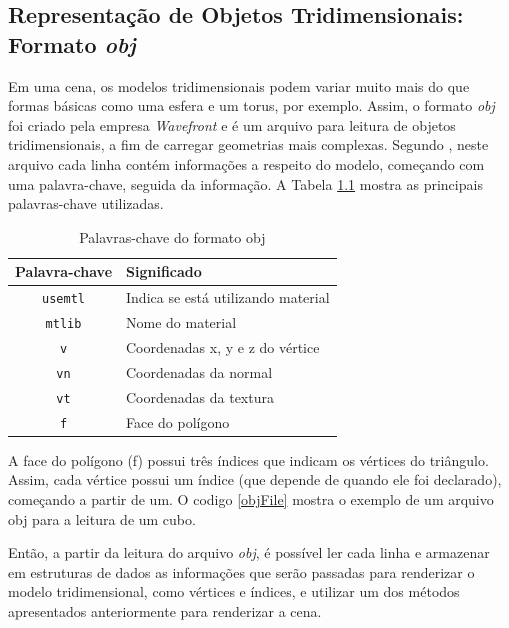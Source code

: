 \begin{anexosenv}
\chapter{Representação de Objetos Tridimensionais: Formato \textit{obj}}
\label{formatobj}

	Em uma cena, os modelos tridimensionais podem variar muito mais do que formas básicas como uma esfera e um torus, por exemplo. Assim, o formato \textit{obj} foi criado pela empresa  \textit{Wavefront} e é um arquivo para leitura de objetos tridimensionais, a fim de carregar geometrias mais complexas. Segundo \cite{graphicsprog}, neste arquivo cada linha contém informações a respeito do modelo, começando com uma palavra-chave, seguida da informação. A  Tabela \ref{palavraschave} mostra as principais palavras-chave utilizadas. 

\begin{table}[ht]
	\centering	
	\begin{tabular}{cl}
		\toprule
		\textbf{Palavra-chave} & \textbf{Significado}  \\
		\midrule
		\texttt{usemtl} & Indica se está utilizando material  \\
		\texttt{mtlib} &  Nome do material \\
		\texttt{v} &  Coordenadas x, y e z do vértice \\
		\texttt{vn} & Coordenadas da normal \\
		\texttt{vt} &  Coordenadas da textura \\
		\texttt{f} &  Face do polígono \\
		\bottomrule
	\end{tabular}
	\caption{ Palavras-chave do formato obj}
	\label{palavraschave}
\end{table}

	A face do polígono (f) possui três índices que indicam os vértices do triângulo. Assim, cada vértice possui um índice (que depende de quando ele foi declarado), começando a partir de um. O codigo \ref{objFile} mostra o exemplo de um arquivo obj para a leitura de um cubo. 

	

	Então, a partir da leitura do arquivo  \textit{obj}, é possível ler cada linha e armazenar em estruturas de dados as informações que serão passadas para renderizar o modelo tridimensional, como vértices e índices, e utilizar um dos métodos apresentados anteriormente para renderizar a cena. 


\end{anexosenv}

